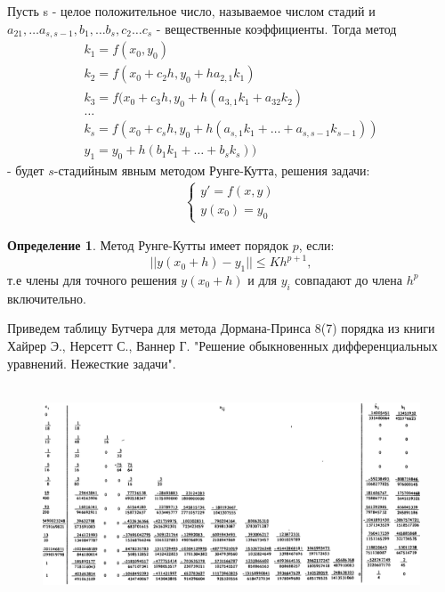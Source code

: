 \documentclass[12pt, a4paper] {report}
\theoremstyle{remark}
\theoremstyle{definition}
\newtheorem{defin}{Определение}
\begin{document}
Пусть s - целое положительное число, называемое числом стадий и $a_{21}, \dots a_{s,s-1}, b_{1}, \dots b_{s}, c_{2} \dots c_{s}$ - вещественные коэффициенты. Тогда метод
\begin{gather}
k_1 = f (x_0, y_0) \nonumber\\
k_2 = f (x_0 + c_2h, y_0 + h a_{2,1} k_1) \nonumber \\
k_3 = f (x_0 + c_3h, y_0 + h (a_{3,1} k_1 + a_{32} k_2) \nonumber\\
\dots \nonumber\\
k_s = f (x_0 + c_s h, y_0 + h(a_{s,1} k_1 + \dots + a_{s,s-1}k_{s-1} ))\nonumber \\
y_1 = y_0 + h (b_1k_1 + \dots + b_s k_s))
\end{gather} - будет $s$-стадийным явным методом Рунге-Кутта, решения задачи:
\begin{gather}
\begin{cases}
y' = f(x, y) \\
y(x_0) = y_0
\end{cases}
\end{gather}
\begin{defin}
Метод Рунге-Кутты имеет порядок $p$, если:
 $$ || y(x_0 + h) - y_1 || \le Kh^{p+1},$$
 т.е члены для точного решения $y(x_0 + h)$ и для $y_i$ совпадают до члена $h^p$ включительно.
\end{defin}
Приведем таблицу Бутчера для метода Дормана-Принса 8(7) порядка из книги Хайрер Э., Нерсетт С., Ваннер Г. "Решение обыкновенных дифференциальных уравнений. Нежесткие задачи".\\
\\\begin{figure}[h!]
\centering
\includegraphics[width=1\linewidth]{dp78.png} 
\end{figure}
\\
\\
\\ \\ \\ \\ \\ \\ \\ \\ \\ \\ \\ \\ \\ 
\end{document}
